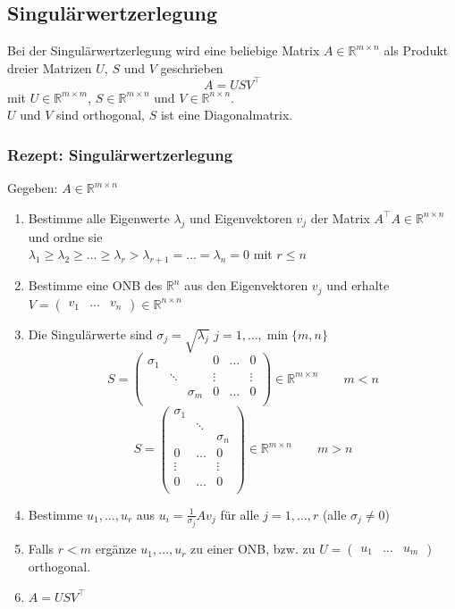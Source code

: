 \documentclass[6pt,a4paper]{scrartcl}
\begin{document}
\begin{multicols*}{4}
\subsection{Singulärwertzerlegung}
Bei der Singulärwertzerlegung wird eine beliebige Matrix $A\in \mathbb{R}^{m\times n}$ als Produkt dreier Matrizen $U$, $S$ und $V$ geschrieben
\begin{equation*}
A=USV^\top
\end{equation*}
mit $U\in \mathbb{R}^{m\times m}$, $S\in \mathbb{R}^{m\times n}$ und $V\in \mathbb{R}^{n\times n}$.\\
$U$ und $V$ sind orthogonal, $S$ ist eine Diagonalmatrix.
\subsubsection{Rezept: Singulärwertzerlegung}
Gegeben: $A\in \mathbb{R}^{m\times n}$
\begin{enumerate}\itemsep0pt
\item Bestimme alle Eigenwerte $\lambda_j$ und Eigenvektoren $v_j$ der Matrix $A^\top A\in \mathbb{R}^{n\times n}$ und ordne sie \\ $\lambda_1\ge\lambda_2\ge \dots \ge \lambda_r>\lambda_{r+1}=\dots=\lambda_n=0$ mit $r\le n$
\item Bestimme eine ONB des $\mathbb{R}^n$ aus den Eigenvektoren $v_j$ und erhalte $V=\begin{pmatrix} 
v_1 &\dots & v_n
\end{pmatrix} \in \mathbb{R}^{n\times n}$
\item Die Singulärwerte sind $\sigma_j=\sqrt{\lambda_j}$ \qquad $j=1,\dots,\min\{m,n\}$
\begin{equation*}
S=\begin{pmatrix}
\sigma_1 & & & 0 & \dots & 0\\
 & \ddots & &  \vdots &  &  \vdots\\
& & \sigma_m & 0 & \dots & 0\\
\end{pmatrix} \in \mathbb{R}^{m\times n}
\qquad m<n
\end{equation*}
\begin{equation*}
S=\begin{pmatrix}
\sigma_1 & & \\
 & \ddots & \\
& & \sigma_n \\
0 & \dots & 0\\
\vdots &  &  \vdots\\
0 & \dots & 0\\
\end{pmatrix} \in \mathbb{R}^{m\times n}
\qquad m>n
\end{equation*}
\item Bestimme $u_1,\dots,u_r$ aus $u_i=\frac{1}{\sigma_j}Av_j$ für alle $j=1,\dots,r$ (alle $\sigma_j\ne 0$)
\item Falls $r<m$ ergänze $u_1,\dots,u_r$ zu einer ONB, bzw. zu $U=\begin{pmatrix}
u_1 & \dots & u_m
\end{pmatrix}$
orthogonal.
\item $A=USV^\top$
\end{enumerate}


\end{multicols*}
\end{document}
